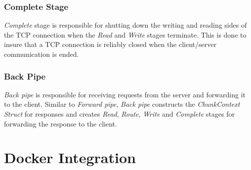\documentclass[a4paper,11pt,twoside]{report}
\begin{document}
\subsubsection*{Complete Stage}
\textit{Complete} stage is responsible for shutting down the writing and reading sides of the TCP connection when the \textit{Read} and \textit{Write} stages terminate. This is done to insure that a TCP connection is reliably closed when the client/server communication is ended. 

\subsubsection*{Back Pipe}
\textit{Back pipe} is responsible for receiving requests from the server and forwarding it to the client. Similar to \textit{Forward pipe}, \textit{Back pipe} constructs the \textit{ChunkContext Struct} for responses and creates \textit{Read}, \textit{Route}, \textit{Write} and \textit{Complete} stages for forwarding the response to the client.

\section{Docker Integration}
\end{document}
